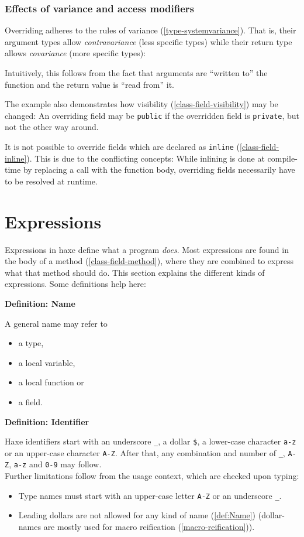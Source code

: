 \documentclass[a4paper,oneside]{book}
\newcommand{\expr}[1]{\texttt{#1}}
\newenvironment{myshaded}
  {\def\FrameCommand{\fboxsep=\topsep\colorbox{bgcolor}}%
  \MakeFramed {\advance\hsize-\width \FrameRestore}}%
 {\endMakeFramed}
\newcommand{\define}[3][Definition]
	{\begin{myshaded}\noindent\textbf{#1: #2}\par\nobreak\noindent\ignorespaces#3\label{def:#2}\end{myshaded}}
\newcommand{\tref}[2]{#1 (\ref{#2})}
\newcommand{\haxe}[2][]{%
}
\begin{document}
\subsection{Effects of variance and access modifiers}
\label{class-field-override-effects}

Overriding adheres to the rules of \tref{variance}{type-systemvariance}. That is, their argument types allow \emph{contravariance} (less specific types) while their return type allows \emph{covariance} (more specific types):

\haxe{assets/OverrideVariance.hx}

Intuitively, this follows from the fact that arguments are ``written to'' the function and the return value is ``read from'' it.

The example also demonstrates how \tref{visibility}{class-field-visibility} may be changed: An overriding field may be \expr{public} if the overridden field is \expr{private}, but not the other way around.

It is not possible to override fields which are declared as \tref{\expr{inline}}{class-field-inline}. This is due to the conflicting concepts: While inlining is done at compile-time by replacing a call with the function body, overriding fields necessarily have to be resolved at runtime.


\chapter{Expressions}
\label{expression}

Expressions in haxe define what a program \emph{does}. Most expressions are found in the body of a \tref{method}{class-field-method}, where they are combined to express what that method should do. This section explains the different kinds of expressions. Some definitions help here:

\define{Name}{A general name may refer to
\begin{itemize}
	\item a type,
	\item a local variable,
	\item a local function or
	\item a field.
\end{itemize}}

\define{Identifier}{Haxe identifiers start with an underscore \expr{_}, a dollar \expr{\$}, a lower-case character \expr{a-z} or an upper-case character \expr{A-Z}. After that, any combination and number of \expr{_}, \expr{A-Z}, \expr{a-z} and \expr{0-9} may follow.\\
Further limitations follow from the usage context, which are checked upon typing:
\begin{itemize}
	\item Type names must start with an upper-case letter \expr{A-Z} or an underscore \expr{_}.
	\item Leading dollars are not allowed for any kind of \tref{name}{def:Name} (dollar-names are mostly used for \tref{macro reification}{macro-reification}).
\end{itemize}}
\end{document}
